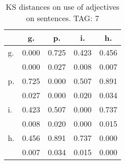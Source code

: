 \begin{table}[h!]
\begin{center}
\begin{tabular}{| l | c | c | c | c |}\hline
 & g. & p. & i. & h. \\\hline
g. & 0.000  & 0.725  & 0.423  & 0.456 \\\hline
 & 0.000  & 0.027  & 0.008  & 0.007 \\\hline
p. & 0.725  & 0.000  & 0.507  & 0.891 \\\hline
 & 0.027  & 0.000  & 0.020  & 0.034 \\\hline
i. & 0.423  & 0.507  & 0.000  & 0.737 \\\hline
 & 0.008  & 0.020  & 0.000  & 0.015 \\\hline
h. & 0.456  & 0.891  & 0.737  & 0.000 \\\hline
 & 0.007  & 0.034  & 0.015  & 0.000 \\\hline
\end{tabular}
\caption{KS distances on use of adjectives on sentences. TAG: 7}
\end{center}
\end{table}